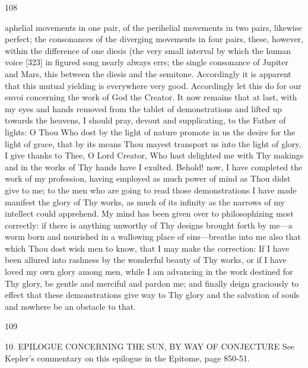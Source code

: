 \documentclass{article}
\begin{document}
108

aphelial movements in one pair, of the perihelial movements in two
pairs, likewise perfect; the consonances of the diverging movements in
four pairs, these, however, within the difference of one diesis (the very
small interval by which the human voice [323] in figured song nearly
always errs; the single consonance of Jupiter and Mars, this between the
diesis and the semitone. Accordingly it is apparent that this mutual
yielding is everywhere very good.
Accordingly let this do for our envoi concerning the work of God the
Creator. It now remains that at last, with my eyes and hands removed
from the tablet of demonstrations and lifted up towards the heavens, I
should pray, devout and supplicating, to the Father of lights: O Thou
Who dost by the light of nature promote in us the desire for the light of
grace, that by its means Thou mayest transport us into the light of
glory, I give thanks to Thee, O Lord Creator, Who hast delighted me
with Thy makings and in the works of Thy hands have I exulted.
Behold! now, I have completed the work of my profession, having
employed as much power of mind as Thou didst give to me; to the men
who are going to read those demonstrations I have made manifest the
glory of Thy works, as much of its infinity as the narrows of my
intellect could apprehend. My mind has been given over to
philosophizing most correctly: if there is anything unworthy of Thy
designs brought forth by me—a worm born and nourished in a
wallowing place of sins—breathe into me also that which Thou dost
wish men to know, that I may make the correction: If I have been
allured into rashness by the wonderful beauty of Thy works, or if I have
loved my own glory among men, while I am advancing in the work
destined for Thy glory, be gentle and merciful and pardon me; and
finally deign graciously to effect that these demonstrations give way to
Thy glory and the salvation of souls and nowhere be an obstacle to that.


109

10. EPILOGUE CONCERNING THE SUN, BY WAY
OF CONJECTURE
See Kepler's commentary on this epilogue in the Epitome, page 850-51.
\end{document}

